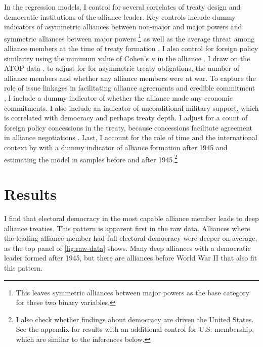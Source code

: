 \documentclass[12pt]{article}
\begin{document}
In the regression models, I control for several correlates of treaty design and democratic institutions of the alliance leader. 
Key controls include dummy indicators of asymmetric alliances between non-major and major powers and symmetric alliances between major powers \citep{Mattes2012}\footnote{This leaves symmetric alliances between major powers as the base category for these two binary variables.} as well as the average threat among alliance members at the time of treaty formation \citep{LeedsSavun2007}. 
I also control for foreign policy similarity using the minimum value of Cohen's $\kappa$ in the alliance \citep{Hage2011}.
I draw on the ATOP data \citep{Leedsetal2002}, to adjust for for asymmetric treaty obligations, the number of alliance members and whether any alliance members were at war. 
To capture the role of issue linkages in facilitating alliance agreements and credible commitment \citep{Poast2012, Poast2013}, I include a dummy indicator of whether the alliance made any economic commitments. 
I also include an indicator of unconditional military support, which is correlated with democracy \citep{Chibaetal2015} and perhaps treaty depth. 
I adjust for a count of foreign policy concessions in the treaty, because concessions facilitate agreement in alliance negotiations \citep{Johnson2015}. 
Last, I account for the role of time and the international context by with a dummy indicator of alliance formation after 1945 and estimating the model in samples before and after 1945.\footnote{I also check whether findings about democracy are driven the United States. See the appendix for results with an additional control for U.S. membership, which are similar to the inferences below.}



\section{Results}


I find that electoral democracy in the most capable alliance member leads to deep alliance treaties. 
This pattern is apparent first in the raw data. 
Alliances where the leading alliance member had full electoral democracy were deeper on average, as the top panel of \autoref{fig:raw-data} shows. 
Many deep alliances with a democratic leader formed after 1945, but there are alliances before World War II that also fit this pattern. 
\end{document}
